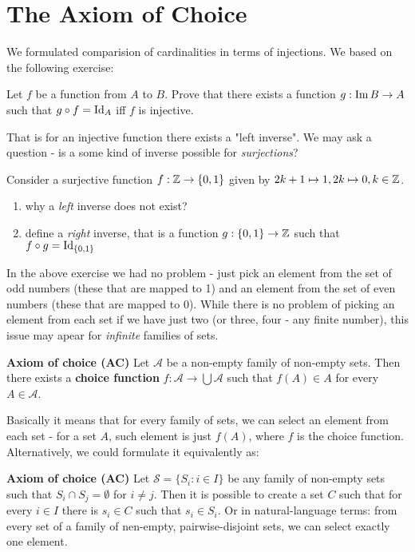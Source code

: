 
\section{The Axiom of Choice}
We formulated comparision of cardinalities in terms of injections. We based on the following exercise:

\begin{exercise}
  Let $f$ be a function from $A$ to $B$. Prove that there exists a function $g: \text{Im}\, B\to A$ such that $g\circ f=\text{Id}_A$ iff $f$ is injective.
\end{exercise}

That is for an injective function there exists a "left inverse". We may ask a question - is a some kind of inverse possible for \emph{surjections}?

\begin{exercise}
  Consider a surjective function $f: \mathbb Z \to \{0,1\}$ given by $2k+1 \mapsto 1, 2k\mapsto 0, k\in \mathbb Z$.
  \begin{enumerate}
    \item why a \emph{left} inverse does not exist?
    \item define a \emph{right} inverse, that is a function $g:\{0,1\}\to \mathbb Z$ such that $f\circ g=\text{Id}_{\{0,1\}}$
  \end{enumerate}
\end{exercise}

In the above exercise we had no problem - just pick an element from the set of odd numbers (these that are mapped to 1) and an element from the set of even numbers (these that are mapped to 0). While there is no problem of picking an element from each set if we have just two (or three, four - any finite number), this issue may apear for \emph{infinite} families
of sets.

\begin{definition}
  \textbf{Axiom of choice (AC)} Let $\mathcal A$ be a non-empty family of non-empty sets. Then there exists a \textbf{choice function} $f:\mathcal A\to \bigcup \mathcal A$ such that
  $f(A)\in A$ for every $A\in \mathcal A$.
\end{definition}

Basically it means that for every family of sets, we can select an element from each set - for a set $A$, such element is just $f(A)$, where $f$ is the choice function. Alternatively,
we could formulate it equivalently as:

\begin{definition}
  \textbf{Axiom of choice (AC)} Let $\mathcal S=\{S_i: i\in I\}$ be any family of non-empty sets such that $S_i\cap S_j=\emptyset$ for $i\neq j$. Then it is possible to create a set $C$ such that for every $i\in I$ there is $s_i\in C$ such that $s_i\in S_i$. Or in natural-language terms: from every set of a family of nen-empty, pairwise-disjoint sets, we can select exactly one element.
\end{definition}

